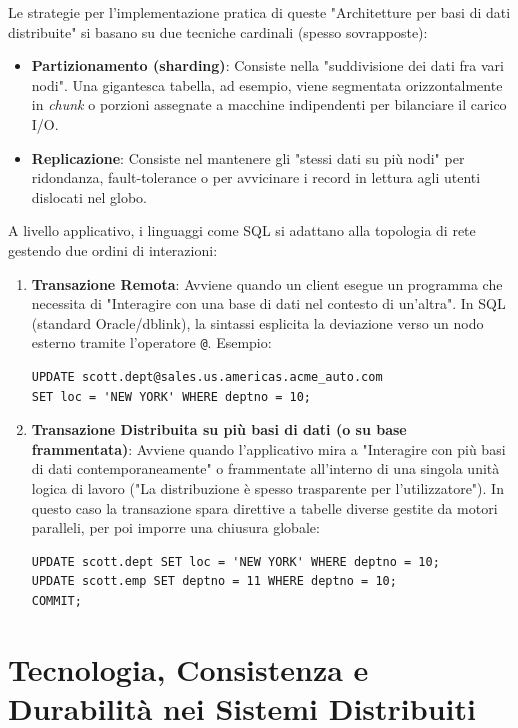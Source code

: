 Le strategie per l'implementazione pratica di queste "Architetture per basi di dati distribuite" si basano su due tecniche cardinali (spesso sovrapposte):
\begin{itemize}
    \item \textbf{Partizionamento (sharding)}: Consiste nella "suddivisione dei dati fra vari nodi". Una gigantesca tabella, ad esempio, viene segmentata orizzontalmente in \textit{chunk} o porzioni assegnate a macchine indipendenti per bilanciare il carico I/O.
    \item \textbf{Replicazione}: Consiste nel mantenere gli "stessi dati su più nodi" per ridondanza, fault-tolerance o per avvicinare i record in lettura agli utenti dislocati nel globo.
\end{itemize}

A livello applicativo, i linguaggi come SQL si adattano alla topologia di rete gestendo due ordini di interazioni:
\begin{enumerate}
    \item \textbf{Transazione Remota}: Avviene quando un client esegue un programma che necessita di "Interagire con una base di dati nel contesto di un'altra". In SQL (standard Oracle/dblink), la sintassi esplicita la deviazione verso un nodo esterno tramite l'operatore \texttt{@}. Esempio:
\begin{verbatim}
UPDATE scott.dept@sales.us.americas.acme_auto.com
SET loc = 'NEW YORK' WHERE deptno = 10;
\end{verbatim}
    \item \textbf{Transazione Distribuita su più basi di dati (o su base frammentata)}: Avviene quando l'applicativo mira a "Interagire con più basi di dati contemporaneamente" o frammentate all'interno di una singola unità logica di lavoro ("La distribuzione è spesso trasparente per l'utilizzatore"). In questo caso la transazione spara direttive a tabelle diverse gestite da motori paralleli, per poi imporre una chiusura globale:
\begin{verbatim}
UPDATE scott.dept SET loc = 'NEW YORK' WHERE deptno = 10;
UPDATE scott.emp SET deptno = 11 WHERE deptno = 10;
COMMIT;
\end{verbatim}
\end{enumerate}

\section{Tecnologia, Consistenza e Durabilità nei Sistemi Distribuiti}

